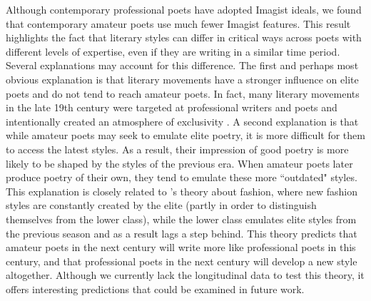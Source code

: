 \documentclass{book}
\begin{document}
Although contemporary professional poets have adopted Imagist ideals, we found that contemporary amateur poets use much fewer Imagist features. This result highlights the fact that literary styles can differ in critical ways across poets with different levels of expertise, even if they are writing in a similar time period. Several explanations may account for this difference. The first and perhaps most obvious explanation is that literary movements have a stronger influence on elite poets and do not tend to reach amateur poets. In fact, many literary movements in the late 19th century were targeted at professional writers and poets and intentionally created an atmosphere of exclusivity \citep{thacker2011imagist}.  A second explanation is that while amateur poets may seek to emulate elite poetry, it is more difficult for them to access the latest styles. As a result, their impression of good poetry is more likely to be shaped by the styles of the previous era. When amateur poets later produce poetry of their own, they tend to emulate these more ``outdated" styles. This explanation is closely related to \cite{simmel1957fashion}'s theory about fashion, where new fashion styles are constantly created by the elite (partly in order to distinguish themselves from the lower class), while the lower class emulates elite styles from the previous season and as a result lags a step behind. This theory predicts that amateur poets in the next century will write more like professional poets in this century, and that professional poets in the next century will develop a new style altogether. Although we currently lack the longitudinal data to test this theory, it offers interesting predictions that could be examined in future work.
\end{document}
